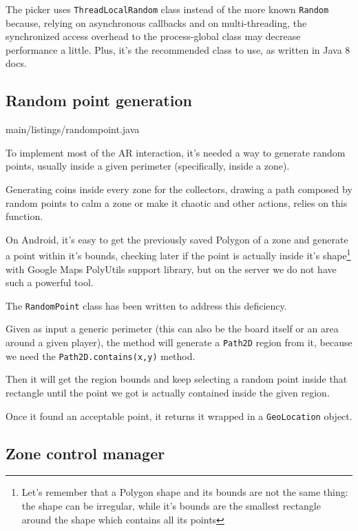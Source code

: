 			The picker uses \lstinline|ThreadLocalRandom| class instead of the more known \lstinline|Random| because, relying on asynchronous callbacks and on multi-threading, the synchronized access overhead to the process-global class may decrease performance a little.
			Plus, it's the recommended class to use, as written in Java 8 docs.
						
		\subsection{Random point generation}\label{focus:point}
		
			
							{main/listings/randompoint.java}
			
			To implement most of the AR interaction, it's needed a way to generate random points, usually inside a given perimeter (specifically, inside a zone).
			
			Generating coins inside every zone for the collectors, drawing a path composed by random points to calm a zone or make it chaotic and other actions, relies on this function.
			
			On Android, it's easy to get the previously saved Polygon of a zone and generate a point within it's bounds, checking later if the point is actually inside it's shape\footnote{Let's remember that a Polygon shape and its bounds are not the same thing: the shape can be irregular, while it's bounds are the smallest rectangle around the shape which contains all its points} with Google Maps PolyUtils support library, but on the server we do not have such a powerful tool.
			
			The \lstinline|RandomPoint| class has been written to address this deficiency.
			
			Given as input a generic perimeter (this can also be the board itself or an area around a given player), the method will generate a \lstinline|Path2D| region from it, because we need the \lstinline|Path2D.contains(x,y)| method.
			
			Then it will get the region bounds and keep selecting a random point inside that rectangle until the point we got is actually contained inside the given region.
			
			Once it found an acceptable point, it returns it wrapped in a \lstinline|GeoLocation| object.
		
		\subsection{Zone control manager}\label{focus:zone}
		
